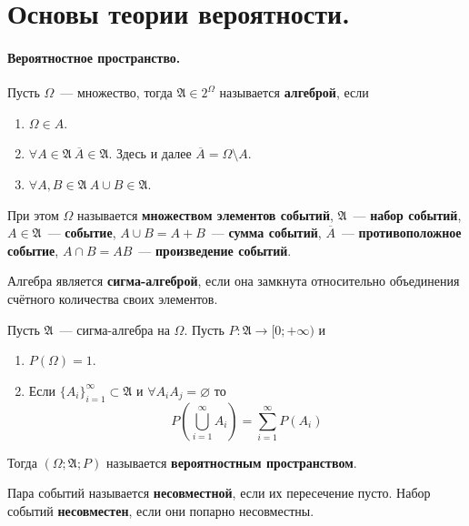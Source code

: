 \documentclass{article}
\newcommand{\A}{{\mathfrak A}}
\begin{document}
    \tableofcontents
    \section{Основы теории вероятности.}
    \paragraph{Вероятностное пространство.}
    \begin{definition}
        Пусть $\Omega$~--- множество, тогда $\A\in 2^\Omega$ называется \textbf{алгеброй}, если
        \begin{enumerate}
            \item $\Omega\in A$.
            \item $\forall A\in\mathfrak A~\overline A\in\A$. Здесь и далее $\overline A=\Omega\setminus A$.
            \item $\forall A,B\in\A~A\cup B\in\A$.
        \end{enumerate}
        При этом $\Omega$ называется \textbf{множеством элементов событий}, $\A$~--- \textbf{набор событий}, $A\in\A$~--- \textbf{событие}, $A\cup B=A+B$~--- \textbf{сумма событий}, $\overline A$~--- \textbf{противоположное событие}, $A\cap B=AB$~--- \textbf{произведение событий}.
    \end{definition}
    \begin{definition}
        Алгебра является \textbf{сигма-алгеброй}, если она замкнута относительно объединения счётного количества своих элементов.
    \end{definition}
    \begin{definition}
        Пусть $\A$~--- сигма-алгебра на $\Omega$. Пусть $P\colon \A\to\mathbb [0;+\infty)$ и
        \begin{enumerate}
            \item $P(\Omega)=1$.
            \item Если $\{A_i\}_{i=1}^\infty\subset\A$ и $\forall A_iA_j=\varnothing$ то
            $$
            P\left(\bigcup\limits_{i=1}^\infty A_i\right)=\sum\limits_{i=1}^\infty P(A_i)
            $$
        \end{enumerate}
        Тогда $(\Omega;\A;P)$ называется \textbf{вероятностным пространством}.
    \end{definition}
    \begin{definition}
        Пара событий называется \textbf{несовместной}, если их пересечение пусто. Набор событий \textbf{несовместен}, если они попарно несовместны.
    \end{definition}
\end{document}

